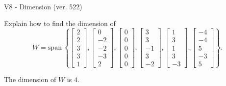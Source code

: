 \begin{exercise}
  \begin{exerciseTitle}V8 - Dimension (ver. 522)\end{exerciseTitle}
  \begin{exerciseStatement}
    Explain how to find the dimension of 
\[W=\mathrm{span}\ \left\{\left[\begin{array}{r}
2 \\
2 \\
3 \\
3 \\
1
\end{array}\right] , \left[\begin{array}{r}
0 \\
-2 \\
-2 \\
-3 \\
2
\end{array}\right] , \left[\begin{array}{r}
0 \\
0 \\
0 \\
0 \\
0
\end{array}\right] , \left[\begin{array}{r}
3 \\
3 \\
-1 \\
3 \\
-2
\end{array}\right] , \left[\begin{array}{r}
1 \\
3 \\
1 \\
3 \\
-3
\end{array}\right] , \left[\begin{array}{r}
-4 \\
-4 \\
5 \\
-3 \\
5
\end{array}\right]\right\}.\]



  \end{exerciseStatement}
  \begin{exerciseAnswer}
   The dimension of \(W\) is  \(4\).
  


  \end{exerciseAnswer}
\end{exercise}
